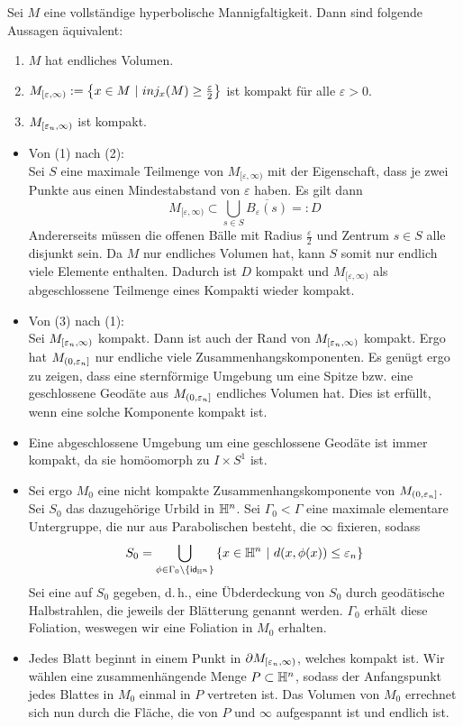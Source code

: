 \documentclass{book}
\renewcommand{\epsilon}{\varepsilon}
\begin{document}
\Prop{}
Sei $M$ eine vollständige hyperbolische Mannigfaltigkeit. Dann sind folgende Aussagen äquivalent:
\begin{enumerate}[(1)]
	\item $M$ hat endliches Volumen.
	\item $M_{[\epsilon, \infty)}:= \set{x\in M}{ inj_x(M) \geq \frac{\epsilon}{2} }$ ist kompakt für alle $\epsilon > 0$.
	\item $\thick$ ist kompakt.
\end{enumerate}
\begin{Beweis}{}
	\begin{itemize}
		\item Von (1) nach (2):\\
		Sei $S$ eine maximale Teilmenge von $M_{[\epsilon,\infty)}$ mit der Eigenschaft, dass je zwei Punkte aus einen Mindestabstand von ${\epsilon}$ haben. Es gilt dann
		\[ M_{[\epsilon, \infty)} \subset \bigcup_{s \in S} \overline{B_{\epsilon}(s)} =: D \]
		Andererseits müssen die offenen Bälle mit Radius $\frac{\epsilon}{2}$ und Zentrum $s \in S$ alle disjunkt sein. Da $M$ nur endliches Volumen hat, kann $S$ somit nur endlich viele Elemente enthalten. Dadurch ist $D$ kompakt und $ M_{[\epsilon, \infty)}$ als abgeschlossene Teilmenge eines Kompakti wieder kompakt.
		\item Von (3) nach (1):\\
		Sei $\thick$ kompakt. Dann ist auch der Rand von $\thick$ kompakt. Ergo hat $\thin$ nur endliche viele Zusammenhangskomponenten. Es genügt ergo zu zeigen, dass eine sternförmige Umgebung um eine Spitze bzw. eine geschlossene Geodäte aus $\thin$ endliches Volumen hat. Dies ist erfüllt, wenn eine solche Komponente kompakt ist.
		\item Eine abgeschlossene Umgebung um eine geschlossene Geodäte ist immer kompakt, da sie homöomorph zu $I \times S^1$ ist.
		\item Sei ergo $M_0$ eine nicht kompakte Zusammenhangskomponente von $\thin$. Sei $S_0$ das dazugehörige Urbild in $\mathbb{H}^n$. Sei $\Gamma_0 < \Gamma$ eine maximale elementare Untergruppe, die nur aus Parabolischen besteht, die $\infty$ fixieren, sodass
		\[ S_0 = \bigcup_{\phi \in \Gamma_0 \setminus \{ \id{\H^n} \}}\set{ x\in \H^n }{ d(x,\phi(x) ) \leq \epsilon_n } \]
		Sei eine  auf $S_0$ gegeben, d.\,h., 
		eine Übderdeckung von $S_0$ durch geodätische Halbstrahlen, die jeweils  der Blätterung genannt werden. $\Gamma_0$ erhält diese Foliation, weswegen wir eine Foliation in $M_0$ erhalten.
		\item Jedes Blatt beginnt in einem Punkt in $\partial \thick$, welches kompakt ist. Wir wählen eine zusammenhängende Menge $P \subset \mathbb{H}^n$, sodass der Anfangspunkt jedes Blattes in $M_0$ einmal in $P$ vertreten ist. Das Volumen von $M_0$ errechnet sich nun durch die Fläche, die von $P$ und $\infty$ aufgespannt ist und endlich ist.
	\end{itemize}
\end{Beweis}
\end{document}
